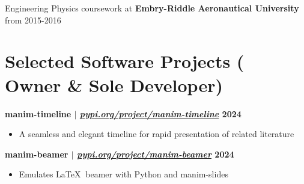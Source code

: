 \documentclass[11pt]{article} %
\begin{document}
\vspace{-4pt}
\noindent
Engineering Physics coursework at \textbf{Embry-Riddle Aeronautical University} from 2015-2016



\vspace{-12pt}

\section{Selected Software Projects (\dag $\,$ Owner \& Sole Developer)}
\vspace{-8pt}
\noindent\textbf{manim-timeline\textsuperscript{\dag} $|$ \href{https://pypi.org/project/manim-timeline}
{\normalfont\textit{pypi.org/project/manim-timeline}} \hfill 2024}
\vspace{-6pt}
\begin{itemize}
\setlength\itemsep{-0.5em}
  \item A seamless and elegant timeline for rapid presentation of related literature
\end{itemize}

\vspace{-4pt}

\noindent\textbf{manim-beamer\textsuperscript{\dag} $|$ \href{https://pypi.org/project/manim-beamer}
{\normalfont\textit{pypi.org/project/manim-beamer}} \hfill 2024}
\vspace{-6pt}
\begin{itemize}
\setlength\itemsep{-0.5em}
  \item Emulates \LaTeX $\:$ beamer with Python and manim-slides
\end{itemize}
\end{document}
